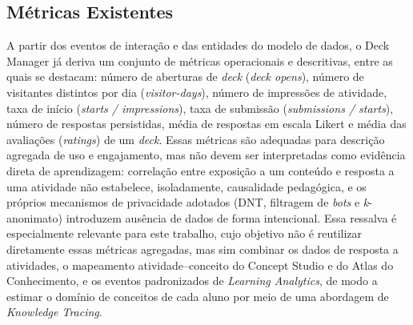\subsection{Métricas Existentes}
\label{subsec:metricas-existentes}

A partir dos eventos de interação e das entidades do modelo de dados, o
Deck Manager já deriva um conjunto de métricas operacionais e
descritivas, entre as quais se destacam: número de aberturas de
\textit{deck} (\textit{deck opens}), número de visitantes distintos por
dia (\textit{visitor-days}), número de impressões de atividade, taxa de
início (\textit{starts / impressions}), taxa de submissão
(\textit{submissions / starts}), número de respostas persistidas, média de
respostas em escala Likert e média das avaliações (\textit{ratings}) de
um \textit{deck}. Essas métricas são adequadas para descrição agregada de
uso e engajamento, mas não devem ser interpretadas como evidência direta
de aprendizagem: correlação entre exposição a um conteúdo e resposta a uma
atividade não estabelece, isoladamente, causalidade pedagógica, e os
próprios mecanismos de privacidade adotados (DNT, filtragem de \textit{bots} e
\textit{k}-anonimato) introduzem ausência de dados de forma intencional.
Essa ressalva é especialmente relevante para este trabalho, cujo objetivo
não é reutilizar diretamente essas métricas agregadas, mas sim combinar os
dados de resposta a atividades, o mapeamento atividade--conceito do
Concept Studio e do Atlas do Conhecimento, e os eventos padronizados de
\textit{Learning Analytics}, de modo a estimar o domínio de conceitos de
cada aluno por meio de uma abordagem de \textit{Knowledge Tracing}.
